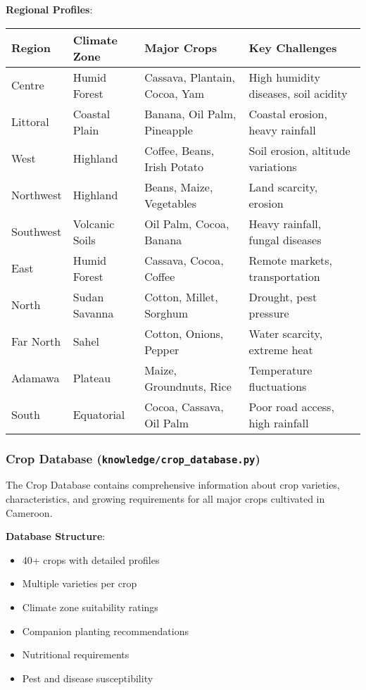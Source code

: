 \documentclass[12pt,a4paper]{article}
\begin{document}
\textbf{Regional Profiles}:
\begin{longtable}{|p{2.5cm}|p{3cm}|p{4cm}|p{4cm}|}
\hline
\textbf{Region} & \textbf{Climate Zone} & \textbf{Major Crops} & \textbf{Key Challenges} \\ \hline
Centre & Humid Forest & Cassava, Plantain, Cocoa, Yam & High humidity diseases, soil acidity \\ \hline
Littoral & Coastal Plain & Banana, Oil Palm, Pineapple & Coastal erosion, heavy rainfall \\ \hline
West & Highland & Coffee, Beans, Irish Potato & Soil erosion, altitude variations \\ \hline
Northwest & Highland & Beans, Maize, Vegetables & Land scarcity, erosion \\ \hline
Southwest & Volcanic Soils & Oil Palm, Cocoa, Banana & Heavy rainfall, fungal diseases \\ \hline
East & Humid Forest & Cassava, Cocoa, Coffee & Remote markets, transportation \\ \hline
North & Sudan Savanna & Cotton, Millet, Sorghum & Drought, pest pressure \\ \hline
Far North & Sahel & Cotton, Onions, Pepper & Water scarcity, extreme heat \\ \hline
Adamawa & Plateau & Maize, Groundnuts, Rice & Temperature fluctuations \\ \hline
South & Equatorial & Cocoa, Cassava, Oil Palm & Poor road access, high rainfall \\ \hline
\end{longtable}

\subsubsection{Crop Database (\texttt{knowledge/crop\_database.py})}

The Crop Database contains comprehensive information about crop varieties, characteristics, and growing requirements for all major crops cultivated in Cameroon.

\textbf{Database Structure}:
\begin{itemize}[leftmargin=*]
    \item 40+ crops with detailed profiles
    \item Multiple varieties per crop
    \item Climate zone suitability ratings
    \item Companion planting recommendations
    \item Nutritional requirements
    \item Pest and disease susceptibility
\end{itemize}
\end{document}
